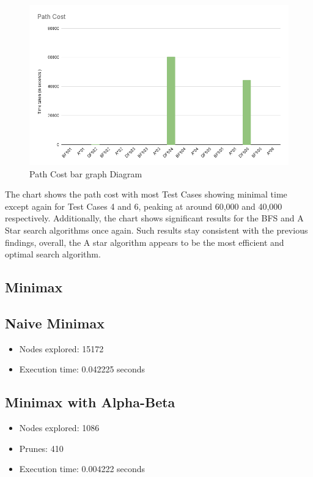\documentclass[journal]{./IEEE/IEEEtran}
\begin{document}
\begin{figure}[H]
    \centering
    \includegraphics[width=1\linewidth]{pictures-Elisha/Path Cost (1).png}
    \caption{Path Cost bar graph Diagram}
    \label{fig:path_cost_bar_graph}
\end{figure}

The chart shows the path cost with most Test Cases showing minimal time except again for 
Test Cases 4 and 6, peaking at around 60,000 and 40,000 respectively. Additionally, the chart 
shows significant results for the BFS and A Star search algorithms once again. Such results stay 
consistent with the previous findings, overall, the A star algorithm appears to be the most efficient 
and optimal search algorithm.


\subsection{Minimax}

\subsection{Naive Minimax}
\begin{itemize}
    \item Nodes explored: 15172
    \item Execution time:  0.042225 seconds
\end{itemize}

\subsection{Minimax with Alpha-Beta}
\begin{itemize}
    \item Nodes explored: 1086
    \item Prunes: 410
    \item Execution time: 0.004222 seconds
\end{itemize} 
\end{document}
